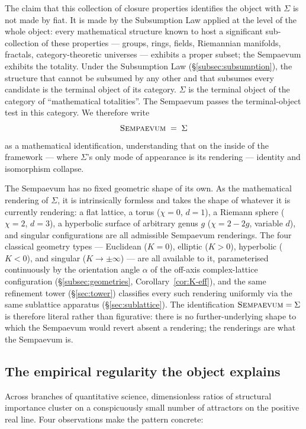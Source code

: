 \documentclass[11pt,a4paper]{article}
\theoremstyle{definition}
\theoremstyle{remark}
\newcommand{\Sempaevum}{\textsc{Sempaevum}}
\begin{document}
The claim that this collection of closure properties identifies the object with $\Sigma$ is not made by fiat. It is made by the Subsumption Law applied at the level of the whole object: every mathematical structure known to host a significant sub-collection of these properties --- groups, rings, fields, Riemannian manifolds, fractals, category-theoretic universes --- exhibits a proper subset; the Sempaevum exhibits the totality. Under the Subsumption Law (\S\ref{subsec:subsumption}), the structure that cannot be subsumed by any other and that subsumes every candidate is the terminal object of its category. $\Sigma$ is the terminal object of the category of ``mathematical totalities''. The Sempaevum passes the terminal-object test in this category. We therefore write
\[
\Sempaevum \;=\; \Sigma
\]
as a mathematical identification, understanding that on the inside of the framework --- where $\Sigma$'s only mode of appearance is its rendering --- identity and isomorphism collapse.

The Sempaevum has no fixed geometric shape of its own. As the mathematical rendering of $\Sigma$, it is intrinsically formless and takes the shape of whatever it is currently rendering: a flat lattice, a torus ($\chi=0$, $d=1$), a Riemann sphere ($\chi=2$, $d=3$), a hyperbolic surface of arbitrary genus $g$ ($\chi=2-2g$, variable $d$), and singular configurations are all admissible Sempaevum renderings. The four classical geometry types --- Euclidean ($K=0$), elliptic ($K>0$), hyperbolic ($K<0$), and singular ($K\to\pm\infty$) --- are all available to it, parameterised continuously by the orientation angle $\alpha$ of the off-axis complex-lattice configuration (\S\ref{subsec:geometries}, Corollary~\ref{cor:K-eff}), and the same refinement tower (\S\ref{sec:tower}) classifies every such rendering uniformly via the same sublattice apparatus (\S\ref{sec:sublattice}). The identification $\Sempaevum = \Sigma$ is therefore literal rather than figurative: there is no further-underlying shape to which the Sempaevum would revert absent a rendering; the renderings are what the Sempaevum is.

\subsection{The empirical regularity the object explains}

Across branches of quantitative science, dimensionless ratios of structural importance cluster on a conspicuously small number of attractors on the positive real line. Four observations make the pattern concrete:
\end{document}
